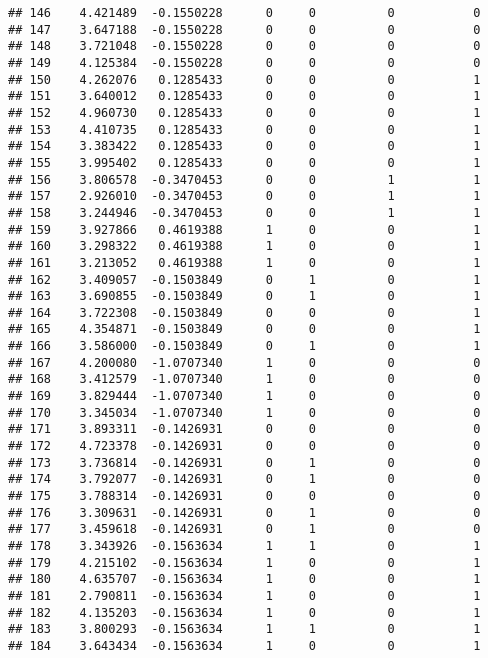\documentclass[
]{article}
\begin{document}
\begin{verbatim}
## 146    4.421489  -0.1550228      0     0          0           0
## 147    3.647188  -0.1550228      0     0          0           0
## 148    3.721048  -0.1550228      0     0          0           0
## 149    4.125384  -0.1550228      0     0          0           0
## 150    4.262076   0.1285433      0     0          0           1
## 151    3.640012   0.1285433      0     0          0           1
## 152    4.960730   0.1285433      0     0          0           1
## 153    4.410735   0.1285433      0     0          0           1
## 154    3.383422   0.1285433      0     0          0           1
## 155    3.995402   0.1285433      0     0          0           1
## 156    3.806578  -0.3470453      0     0          1           1
## 157    2.926010  -0.3470453      0     0          1           1
## 158    3.244946  -0.3470453      0     0          1           1
## 159    3.927866   0.4619388      1     0          0           1
## 160    3.298322   0.4619388      1     0          0           1
## 161    3.213052   0.4619388      1     0          0           1
## 162    3.409057  -0.1503849      0     1          0           1
## 163    3.690855  -0.1503849      0     1          0           1
## 164    3.722308  -0.1503849      0     0          0           1
## 165    4.354871  -0.1503849      0     0          0           1
## 166    3.586000  -0.1503849      0     1          0           1
## 167    4.200080  -1.0707340      1     0          0           0
## 168    3.412579  -1.0707340      1     0          0           0
## 169    3.829444  -1.0707340      1     0          0           0
## 170    3.345034  -1.0707340      1     0          0           0
## 171    3.893311  -0.1426931      0     0          0           0
## 172    4.723378  -0.1426931      0     0          0           0
## 173    3.736814  -0.1426931      0     1          0           0
## 174    3.792077  -0.1426931      0     1          0           0
## 175    3.788314  -0.1426931      0     0          0           0
## 176    3.309631  -0.1426931      0     1          0           0
## 177    3.459618  -0.1426931      0     1          0           0
## 178    3.343926  -0.1563634      1     1          0           1
## 179    4.215102  -0.1563634      1     0          0           1
## 180    4.635707  -0.1563634      1     0          0           1
## 181    2.790811  -0.1563634      1     0          0           1
## 182    4.135203  -0.1563634      1     0          0           1
## 183    3.800293  -0.1563634      1     1          0           1
## 184    3.643434  -0.1563634      1     0          0           1

\end{verbatim}
\end{document}
